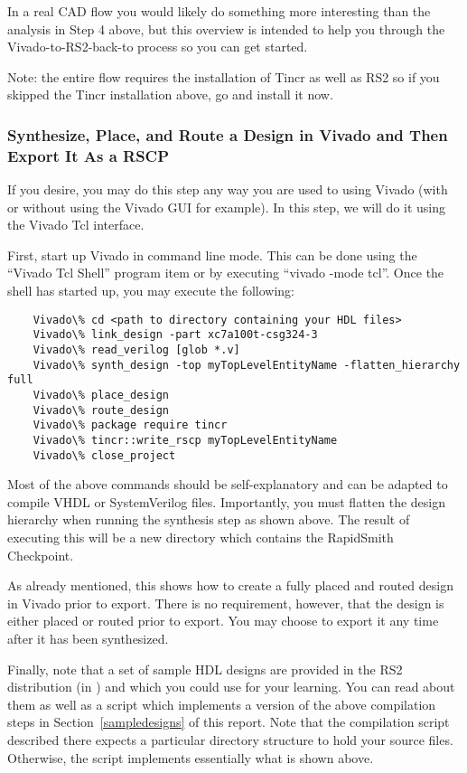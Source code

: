 In a real CAD flow you would likely do something more interesting
than the analysis in Step 4 above, but this overview is intended to help you
through the Vivado-to-RS2-back-to process so you can get started.

Note: the entire flow requires the installation of Tincr as well as RS2 so if
you skipped the Tincr installation above, go and install it now.

\subsubsection{Synthesize, Place, and Route a Design in Vivado and Then Export
It As a RSCP} If you desire, you may do this step any way you are used to using
Vivado (with or without using the Vivado GUI for example).  In this step, we
will do it using the Vivado Tcl interface.

First, start up Vivado in command line mode.  This can be done using the
``Vivado Tcl Shell'' program item or by executing ``vivado -mode tcl''.  Once
the shell has started up, you may execute the following:
                
\begin{lstlisting}
	Vivado\% cd <path to directory containing your HDL files>
	Vivado\% link_design -part xc7a100t-csg324-3
	Vivado\% read_verilog [glob *.v]
	Vivado\% synth_design -top myTopLevelEntityName -flatten_hierarchy full 
	Vivado\% place_design
	Vivado\% route_design
	Vivado\% package require tincr
	Vivado\% tincr::write_rscp myTopLevelEntityName
	Vivado\% close_project
\end{lstlisting}
Most of the above commands should be self-explanatory and can be adapted to
compile VHDL or SystemVerilog files.
Importantly,  you must flatten the design hierarchy when running
the synthesis step as shown above.  The result of executing this will be a new
directory which contains the RapidSmith Checkpoint.

As already mentioned, this shows how to create a fully placed and routed design
in Vivado prior to export.  There is no requirement, however, that the design is
either placed or routed prior to export.  You may choose to export it any time
after it has been synthesized.

Finally, note that a set of sample HDL designs are provided in the RS2
distribution (in ) and which you could use for your
learning.
You can read about them as well as a script which implements a version of the
above compilation steps in Section~\ref{sampledesigns} of this report.  Note
that the compilation script described there expects a particular directory
structure to hold your source files.  Otherwise, the script implements 
essentially what is shown above.

